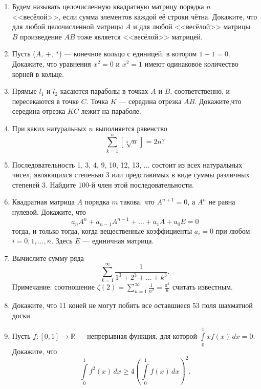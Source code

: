 \begin{enumerate}

\item Будем называть целочисленную квадратную матрицу порядка $n$ <<весёлой>>, если сумма элементов каждой её строки чётна. Докажите, что для любой целочисленной матрицы $A$ и для любой <<весёлой>> матрицы $B$ произведение $AB$ тоже является <<весёлой>> матрицей.

\item  Пусть ($A$, $+$, $*$) --- конечное кольцо с единицей, в котором $1 + 1 = 0$. Докажите, что уравнения
$x^2 = 0$ и $x^2 = 1$ имеют одинаковое количество корней в кольце.

\item Прямые $l_1$ и $l_2$ касаются параболы в точках $A$ и $B$, соответственно, и пересекаются в точке $C$. Точка $K$ --- середина отрезка $AB$. Докажите,что середина отрезка $KC$ лежит на параболе.

\item При каких натуральных $n$ выполняется равенство
$$\sum\limits_{k=1}^n \left[ \sqrt[k]{n}\,\right] = 2 n ?$$

\item Последовательность 1, 3, 4, 9, 10, 12, 13, $\hdots$ состоит из всех натуральных чисел, являющихся степенью 3 или представимых в виде суммы различных степеней 3. Найдите 100-й член этой последовательности.

\item Квадратная матрица $A$ порядка $m$ такова, что $A^{n+1} = 0$, а $A^n$ не равна нулевой. Докажите, что 
$$a_n A^n + a_{n-1} A^{n-1} + \hdots + a_1 A + a_0 E = 0$$
тогда, и только тогда, когда вещественные коэффициенты $a_i = 0$ при любом $i = 0, 1, \hdots, n$. Здесь $E$ --- единичная матрица.

\item Вычислите сумму ряда
$$\sum_{k=1}^{\infty} \frac{1}{1^3 + 2^3 + \hdots + k^3}.$$
Примечание: соотношение $\zeta(2) = \sum\limits_{n=1}^{\infty} \frac{1}{n^2} = \frac{\pi^2}{6}$ считать известным.

\item Докажите, что 11 коней не могут побить все оставшиеся 53 поля шахматной доски.

\item Пусть $f: [0, 1] \rightarrow \mathbb{R}$ --- непрерывная функция, для которой $\int\limits_{0}^{1} x f(x)\,dx = 0$. Докажите, что
$$\int\limits_{0}^{1} f^2(x)\,dx \geqslant 4 \left( \int\limits_{0}^{1} f(x)\,dx \right)^2.$$


\end{enumerate}

